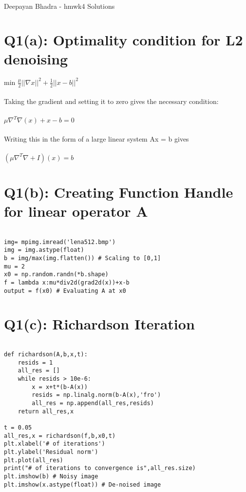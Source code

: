 \documentclass{article}
\begin{document}
\begin{center}{\huge  Deepayan Bhadra - hmwk4 Solutions}\end{center}

\section*{Q1(a): Optimality condition for  L2 denoising}
min $\frac{\mu}{2}||\nabla{x}||^2 + \frac{1}{2}||x-b||^2$ 
\\\\
Taking the gradient and setting it to zero gives the necessary condition: 
\\\\
$\mu \nabla^T\nabla(x) + x - b = 0$ 
\\\\ 
Writing this in the form of a large linear system Ax = b gives \\\\
$ (\mu \nabla^T\nabla + I)(x) = b $ 

\section*{Q1(b): Creating Function Handle for linear operator A}

\begin{verbatim}

img= mpimg.imread('lena512.bmp')
img = img.astype(float)
b = img/max(img.flatten()) # Scaling to [0,1]
mu = 2
x0 = np.random.randn(*b.shape)
f = lambda x:mu*div2d(grad2d(x))+x-b
output = f(x0) # Evaluating A at x0 

\end{verbatim}

\section*{Q1(c): Richardson Iteration}

\begin{verbatim}

def richardson(A,b,x,t):
    resids = 1
    all_res = []
    while resids > 10e-6:
        x = x+t*(b-A(x))
        resids = np.linalg.norm(b-A(x),'fro')
        all_res = np.append(all_res,resids)
    return all_res,x

t = 0.05    
all_res,x = richardson(f,b,x0,t)        
plt.xlabel('# of iterations')
plt.ylabel('Residual norm')
plt.plot(all_res)
print("# of iterations to convergence is",all_res.size)
plt.imshow(b) # Noisy image
plt.imshow(x.astype(float)) # De-noised image

\end{verbatim}
\end{document}
